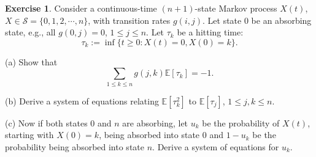 \documentclass[12pt]{article}
\theoremstyle{definition}
\newtheorem{exer}{Exercise}
\theoremstyle{remark}
\begin{document}
\begin{exer}
  Consider a continuous-time $(n+1)$-state
Markov process $X(t)$, $X\in\mathcal{S}=\{0,1,2,\cdots,n\}$,
with transition rates $g(i,j)$.  Let state $0$ be an absorbing
state, e.g., all $g(0,j)=0$, $1\le j\le n$.  Let $\tau_k$ be a
hitting time:
\[
    \tau_k := \inf \big\{ t\ge 0: X(t)=0, X(0)=k\big\}.
\]

(a) Show that 
\[
      \sum_{1\le k\le n} g(j,k)\mathbb{E}[\tau_k] = -1.
\]

(b) Derive a system of equations relating $\mathbb{E}[\tau_k^2]$
to $\mathbb{E}[\tau_j]$, $1\le j,k\le n$.

(c)  Now if both states $0$ and $n$ are absorbing, let
$u_k$ be the probability of $X(t)$, starting with 
$X(0)=k$, being absorbed into state $0$
and $1-u_k$ be the probability being absorbed into state $n$.
Derive a system of equations for $u_k$.
\end{exer}
\end{document}
